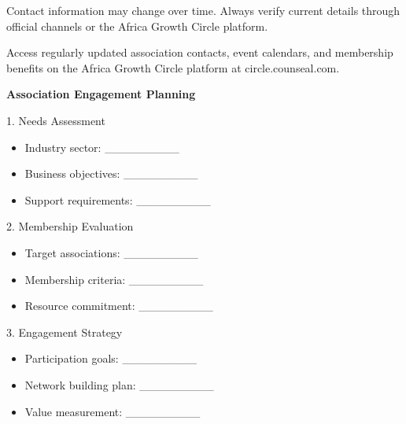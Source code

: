 \begin{warningbox}
Contact information may change over time. Always verify current details through official channels or the Africa Growth Circle platform.
\end{warningbox}

\vspace{1em}

\begin{communitybox}
Access regularly updated association contacts, event calendars, and membership benefits on the Africa Growth Circle platform at circle.counseal.com.
\end{communitybox}

\vspace{1em}

\begin{workshopbox}
\textbf{Association Engagement Planning}

1. Needs Assessment
\begin{itemize}[leftmargin=*]
    \item Industry sector: \_\_\_\_\_\_\_\_\_
    \item Business objectives: \_\_\_\_\_\_\_\_\_
    \item Support requirements: \_\_\_\_\_\_\_\_\_
\end{itemize}

2. Membership Evaluation
\begin{itemize}[leftmargin=*]
    \item Target associations: \_\_\_\_\_\_\_\_\_
    \item Membership criteria: \_\_\_\_\_\_\_\_\_
    \item Resource commitment: \_\_\_\_\_\_\_\_\_
\end{itemize}

3. Engagement Strategy
\begin{itemize}[leftmargin=*]
    \item Participation goals: \_\_\_\_\_\_\_\_\_
    \item Network building plan: \_\_\_\_\_\_\_\_\_
    \item Value measurement: \_\_\_\_\_\_\_\_\_
\end{itemize}
\end{workshopbox}